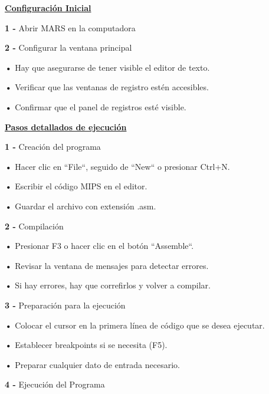 \documentclass{article}
\begin{document}
\quad

\textbf{\underline{Configuración Inicial}}

\quad

\textbf{1 -  } { Abrir MARS en la computadora}

\quad

\textbf{2 -  } { Configurar la ventana principal}

\quad

\textbf{    •} { Hay que asegurarse de tener visible el editor de texto.}


\textbf{    •} { Verificar que las ventanas de registro estén accesibles.}


\textbf{    •} { Confirmar que el panel de registros esté visible.}

\quad


\textbf{\underline{Pasos detallados de ejecución}}

\quad

\textbf{1 -  } { Creación del programa}

\quad

\textbf{    •} { Hacer clic en ``File``,  seguido de ``New`` o presionar Ctrl+N.}

\textbf{    •} { Escribir el código MIPS en el editor.}

\textbf{    •} { Guardar el archivo con extensión .asm.}

\quad

\textbf{2 -  } { Compilación}

\quad

\textbf{    •} { Presionar F3 o hacer clic en el botón ``Assemble``.}

\textbf{    •} { Revisar la ventana de mensajes para detectar errores.}

\textbf{    •} { Si hay errores, hay que correfirlos y volver a compilar.}

\quad

\textbf{3 -  } { Preparación para la ejecución}

\quad

\textbf{    •} { Colocar el cursor en la primera línea de código que se desea ejecutar.}

\textbf{    •} { Establecer breakpoints si se necesita (F5).}

\textbf{    •} { Preparar cualquier dato de entrada necesario.}

\quad

\textbf{4 -  } { Ejecución del Programa}

\quad
\end{document}
